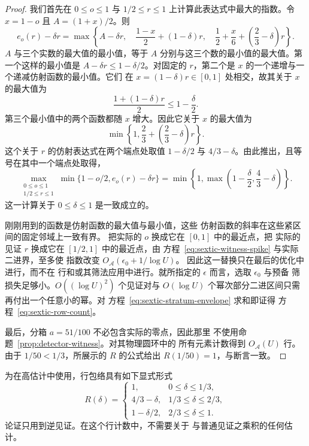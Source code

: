 \begin{proof}
我们首先在
$0\le o\le1$ 与 $1/2\le r\le1$ 上计算此表达式中最大的指数。令 $x=1-o$ 且 $A=(1+x)/2$。则
\[
 e_o(r)-\delta r
 =\max\left\{
 A-\delta r,\quad
 \frac{1-x}{2}+(1-\delta)r,\quad
 \frac12+\frac x6+\left(\frac23-\delta\right)r
 \right\}.
\]
$A$ 与三个实数的最大值的最小值，等于 $A$ 分别与这三个数的最小值的最大值。第一个这样的最小值是
$A-\delta r\le1-\delta/2$。对固定的 $r$，第二个是
$x$ 的一个递增与一个递减仿射函数的最小值。它们
在 $x=(1-\delta)r\in[0,1]$ 处相交，故其关于 $x$ 的最大值为
\[
 \frac{1+(1-\delta)r}{2}\le1-\frac\delta2.
\]
第三个最小值中的两个函数都随 $x$ 增大。因此它关于
$x$ 的最大值为
\[
 \min\left\{1,\frac23+\left(\frac23-\delta\right)r\right\}.
\]
这个关于 $r$ 的仿射表达式在两个端点处取值 $1-\delta/2$ 与
$4/3-\delta$。由此推出，且等号在其中一个端点处取得，
\begin{equation}\label{eq:sextic-envelope-optimization}
 \max_{\substack{0\le o\le1\\1/2\le r\le1}}
 \min\{1-o/2,e_o(r)-\delta r\}
 =\min\left\{1,\max\left(1-\frac\delta2,\frac43-\delta\right)\right\}.
\end{equation}
这一计算关于 $0\le\delta\le1$ 是一致成立的。

刚刚用到的函数是仿射函数的最大值与最小值，这些
仿射函数的斜率在这些紧区间的固定邻域上一致有界。
把实际的 $o$ 换成它在 $[0,1]$ 中的最近点，把
实际的见证 $r$ 换成它在 $[1/2,1]$ 中的最近点，由
方程~\eqref{eq:sextic-witness-spike} 与实际二进界，至多使
指数改变 $O_{\mathcal A}(\epsilon_0+1/\log U)$。
因此这一替换只在最后的优化中进行，而不在
行和或其筛法应用中进行。就所指定的 $\epsilon$ 而言，选取 $\epsilon_0$ 与预备
筛损失足够小。$O((\log U)^2)$ 个见证对与 $O(\log U)$ 个幂次部分二进区间只需
再付出一个任意小的幂。对
方程~\eqref{eq:sextic-stratum-envelope} 求和即证得
方程~\eqref{eq:sextic-row-count}。

最后，分箱 $a=51/100$ 不必包含实际的零点，因此那里
不使用命题~\ref{prop:detector-witness}。对其物理圆环中的
所有元素计数得到 $O_{\mathcal A}(U)$ 行。由于
$1/50<1/3$，所展示的 $R$ 的公式给出 $R(1/50)=1$，与断言一致。
\end{proof}

为在高估计中使用，行包络具有如下显式形式
\[
 R(\delta)=
 \begin{cases}
  1,&0\le\delta\le1/3,\\
  4/3-\delta,&1/3\le\delta\le2/3,\\
  1-\delta/2,&2/3\le\delta\le1.
 \end{cases}
\]
论证只用到逆见证。在这个行计数中，不需要关于
与普通见证之乘积的任何估计。

